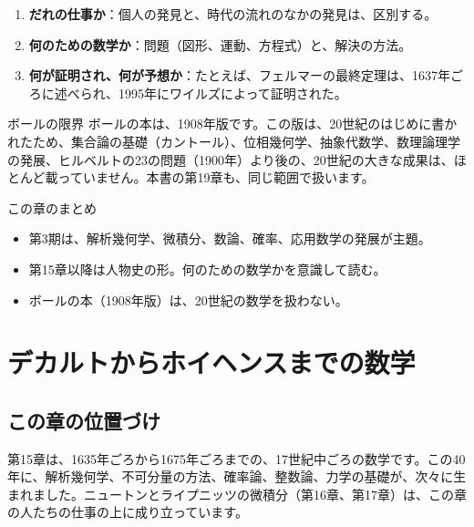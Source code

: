 \documentclass[a4paper,11pt,openany]{ltjsbook}
\begin{document}
\begin{enumerate}[leftmargin=*]
\item \textbf{だれの仕事か}：個人の発見と、時代の流れのなかの発見は、区別する。
\item \textbf{何のための数学か}：問題（図形、運動、方程式）と、解決の方法。
\item \textbf{何が証明され、何が予想か}：たとえば、フェルマーの最終定理は、1637年ごろに述べられ、1995年にワイルズによって証明された。
\end{enumerate}

\begin{notebox}{ボールの限界}
ボールの本は、1908年版です。この版は、20世紀のはじめに書かれたため、集合論の基礎（カントール）、位相幾何学、抽象代数学、数理論理学の発展、ヒルベルトの23の問題（1900年）より後の、20世紀の大きな成果は、ほとんど載っていません。本書の第19章も、同じ範囲で扱います。
\end{notebox}

\begin{pointbox}{この章のまとめ}
\begin{itemize}[leftmargin=*]
\item 第3期は、解析幾何学、微積分、数論、確率、応用数学の発展が主題。
\item 第15章以降は人物史の形。何のための数学かを意識して読む。
\item ボールの本（1908年版）は、20世紀の数学を扱わない。
\end{itemize}
\end{pointbox}

\chapter{デカルトからホイヘンスまでの数学}

\section{この章の位置づけ}

第15章は、1635年ごろから1675年ごろまでの、17世紀中ごろの数学です。この40年に、解析幾何学、不可分量の方法、確率論、整数論、力学の基礎が、次々に生まれました。ニュートンとライプニッツの微積分（第16章、第17章）は、この章の人たちの仕事の上に成り立っています。
\end{document}
